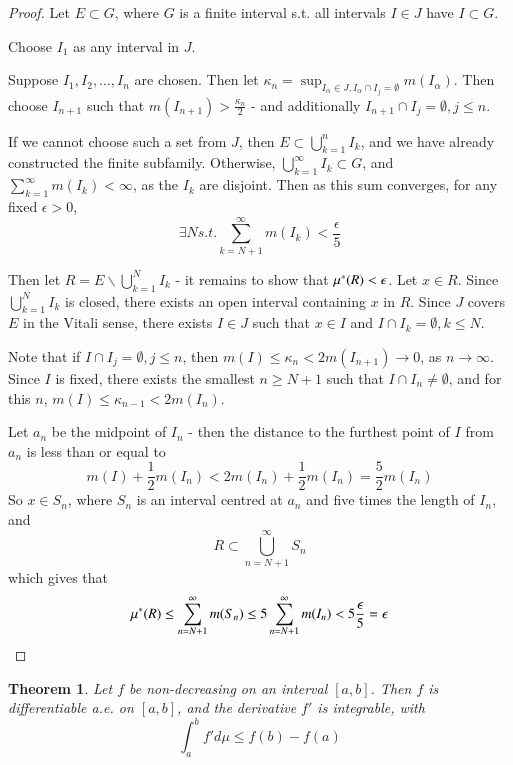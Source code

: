 \documentclass[11pt,a4paper]{report}
\theoremstyle{plain}
\newtheorem{thm}{Theorem}[section]
\theoremstyle{definition}
\theoremstyle{remark}
\newcommand{\intersection}{\cap}
\newcommand{\Union}{\bigcup}
\begin{document}
\begin{proof}
  Let $E \subset G$, where $G$ is a finite interval s.t. all intervals $I \in J$ have $I \subset G$.

  Choose $I_1$ as any interval in $J$.

    Suppose $I_1, I_2, \dots, I_n$ are chosen. Then let $\kappa_n = \sup_{I_\alpha \in J, I_\alpha \intersection I_j = \emptyset} m(I_\alpha)$. Then choose $I_{n+1}$ such that $m(I_{n+1}) > \frac{\kappa_n}{2}$ - and additionally $I_{n+1} \intersection I_j = \emptyset, j \le n$.

    If we cannot choose such a set from $J$, then $E \subset \Union_{k=1}^n I_k$, and we have already constructed the finite subfamily. Otherwise, $\Union_{k=1}^\infty I_k \subset G$, and $\sum_{k=1}^\infty m(I_k) < \infty$, as the $I_k$ are disjoint. Then as this sum converges, for any fixed $\epsilon > 0$, 
    $$ \exists N s.t. \sum_{k=N+1}^\infty m(I_k) < \frac{\epsilon}{5} $$

    Then let $R = E \backslash \Union_{k=1}^N I_k$ - it remains to show that $\mu^{*}(R) < \epsilon$. Let $x \in R$. Since $\Union_{k=1}^N I_k$ is closed, there exists an open interval containing $x$ in $R$. Since $J$ covers $E$ in the Vitali sense, there exists $I \in J$ such that $x \in I$ and $I \intersection I_k = \emptyset, k \le N$.

    Note that if $I \intersection I_j = \emptyset, j \le n$, then $m(I) \le \kappa_n < 2m(I_{n+1}) \rightarrow 0$, as $n \rightarrow \infty$. Since $I$ is fixed, there exists the smallest $n \ge N+1$ such that $I \intersection I_n \ne \emptyset$, and for this $n$, $m(I) \le \kappa_{n-1} < 2m(I_n)$.

    Let $a_n$ be the midpoint of $I_n$ - then the distance to the furthest point of $I$ from $a_n$  is less than or equal to 
    $$ m(I) + \frac{1}{2}m(I_n) < 2m(I_n) + \frac{1}{2}m(I_n) = \frac{5}{2}m(I_n) $$
    So $x \in S_n$, where $S_n$ is an interval centred at $a_n$ and five times the length of $I_n$, and
    $$ R \subset \Union_{n=N+1}^\infty S_n $$
    which gives that
    $$ \mu^{*}(R) \le \sum_{n=N+1}^\infty m(S_n) \le 5\sum_{n=N+1}^\infty m(I_n) < 5\frac{\epsilon}{5} = \epsilon $$
\end{proof}

\begin{thm}
  Let $f$ be non-decreasing on an interval $[a, b]$. Then $f$ is differentiable a.e. on $[a, b]$, and the derivative $f'$ is integrable, with
  $$ \int_a^b f' d\mu \le f(b) - f(a) $$
\end{thm}
\end{document}

